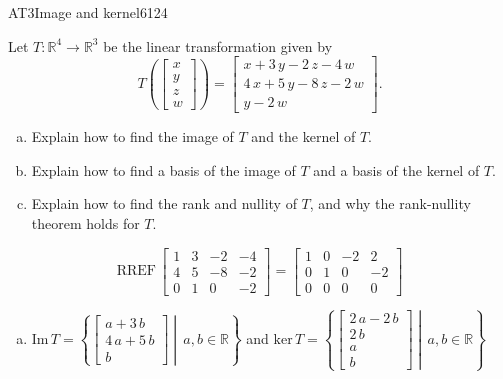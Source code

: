 \begin{exercise}{AT3}{Image and kernel}{6124} 
\begin{exerciseStatement} 

 Let \(T:\mathbb{R}^4 \to \mathbb{R}^3\) be the linear transformation given by \[T\left( \left[\begin{array}{c}
x \\
y \\
z \\
{w}
\end{array}\right] \right) = \left[\begin{array}{c}
x + 3 \, y - 2 \, z - 4 \, {w} \\
4 \, x + 5 \, y - 8 \, z - 2 \, {w} \\
y - 2 \, {w}
\end{array}\right].\] 

 

\begin{enumerate}[(a)]
\item Explain how to find the image of \(T\) and the kernel of \(T\).
\item Explain how to find a basis of the image of \(T\) and a basis of the kernel of \(T\).
\item Explain how to find the rank and nullity of \(T\), and why the rank-nullity theorem holds for \(T\).
\end{enumerate}

     \end{exerciseStatement}
 \begin{exerciseAnswer} 

\[\mathrm{RREF}\,\left[\begin{array}{cccc}
1 & 3 & -2 & -4 \\
4 & 5 & -8 & -2 \\
0 & 1 & 0 & -2
\end{array}\right]=\left[\begin{array}{cccc}
1 & 0 & -2 & 2 \\
0 & 1 & 0 & -2 \\
0 & 0 & 0 & 0
\end{array}\right]\]

 

\begin{enumerate}[(a)]
\item  

 \(\mathrm{Im}\,T =  \left\{ \left[\begin{array}{c}
a + 3 \, b \\
4 \, a + 5 \, b \\
b
\end{array}\right] \middle|\,a,b\in\mathbb{R}\right\}\) and \(\mathrm{ker}\,T = \left\{ \left[\begin{array}{c}
2 \, a - 2 \, b \\
2 \, b \\
a \\
b
\end{array}\right] \middle|\,a,b\in\mathbb{R}\right\}\) 


\end{enumerate}
\end{exerciseAnswer}
\end{exercise}
